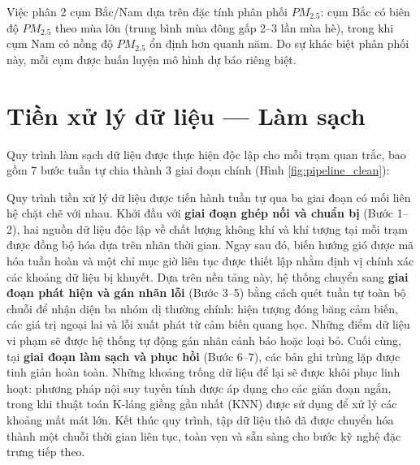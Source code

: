 Việc phân 2 cụm Bắc/Nam dựa trên đặc tính phân phối $PM_{2.5}$: cụm Bắc có biên độ $PM_{2.5}$ theo mùa lớn (trung bình mùa đông gấp 2--3 lần mùa hè), trong khi cụm Nam có nồng độ $PM_{2.5}$ ổn định hơn quanh năm. Do sự khác biệt phân phối này, mỗi cụm được huấn luyện mô hình dự báo riêng biệt.

\section{Tiền xử lý dữ liệu --- Làm sạch}

Quy trình làm sạch dữ liệu được thực hiện độc lập cho mỗi trạm quan trắc, bao gồm 7 bước tuần tự chia thành 3 giai đoạn chính (Hình \ref{fig:pipeline_clean}):

Quy trình tiền xử lý dữ liệu được tiến hành tuần tự qua ba giai đoạn có mối liên hệ chặt chẽ với nhau. Khởi đầu với \textbf{giai đoạn ghép nối và chuẩn bị} (Bước 1--2), hai nguồn dữ liệu độc lập về chất lượng không khí và khí tượng tại mỗi trạm được đồng bộ hóa dựa trên nhãn thời gian. Ngay sau đó, biến hướng gió được mã hóa tuần hoàn và một chỉ mục giờ liên tục được thiết lập nhằm định vị chính xác các khoảng dữ liệu bị khuyết. Dựa trên nền tảng này, hệ thống chuyển sang \textbf{giai đoạn phát hiện và gán nhãn lỗi} (Bước 3--5) bằng cách quét tuần tự toàn bộ chuỗi để nhận diện ba nhóm dị thường chính: hiện tượng đóng băng cảm biến, các giá trị ngoại lai và lỗi xuất phát từ cảm biến quang học. Những điểm dữ liệu vi phạm sẽ được hệ thống tự động gán nhãn cảnh báo hoặc loại bỏ. Cuối cùng, tại \textbf{giai đoạn làm sạch và phục hồi} (Bước 6--7), các bản ghi trùng lặp được tinh giản hoàn toàn. Những khoảng trống dữ liệu để lại sẽ được khôi phục linh hoạt: phương pháp nội suy tuyến tính được áp dụng cho các gián đoạn ngắn, trong khi thuật toán K-láng giềng gần nhất (KNN) được sử dụng để xử lý các khoảng mất mát lớn. Kết thúc quy trình, tập dữ liệu thô đã được chuyển hóa thành một chuỗi thời gian liên tục, toàn vẹn và sẵn sàng cho bước kỹ nghệ đặc trưng tiếp theo.

